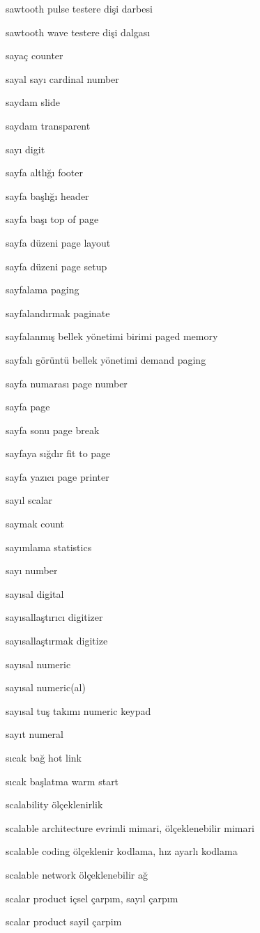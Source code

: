 \documentclass[12pt,fleqn]{article}\usepackage{../../common}
\begin{document}
sawtooth pulse testere dişi darbesi

sawtooth wave testere dişi dalgası

sayaç counter

sayal sayı cardinal number

saydam slide

saydam transparent

sayı digit

sayfa altlığı footer

sayfa başlığı header

sayfa başı top of page

sayfa düzeni page layout

sayfa düzeni page setup

sayfalama paging

sayfalandırmak paginate

sayfalanmış bellek yönetimi birimi paged memory

sayfalı görüntü bellek yönetimi demand paging

sayfa numarası page number

sayfa page

sayfa sonu page break

sayfaya sığdır fit to page

sayfa yazıcı page printer

sayıl scalar

saymak count

sayımlama statistics

sayı number

sayısal digital

sayısallaştırıcı digitizer

sayısallaştırmak digitize

sayısal numeric

sayısal numeric(al)

sayısal tuş takımı numeric keypad

sayıt numeral

sıcak bağ hot link

sıcak başlatma warm start

scalability ölçeklenirlik

scalable architecture evrimli mimari, ölçeklenebilir mimari

scalable coding ölçeklenir kodlama, hız ayarlı kodlama

scalable network ölçeklenebilir ağ

scalar product içsel çarpım, sayıl çarpım

scalar product sayil çarpim
\end{document}
